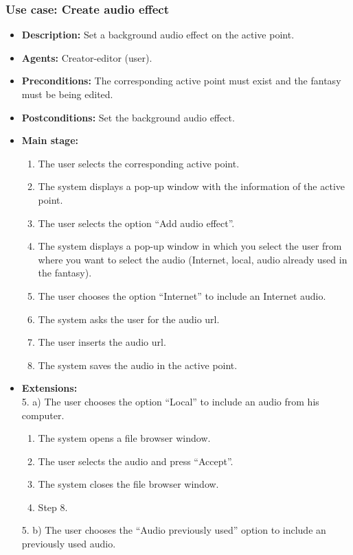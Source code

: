 \subsubsection{Use case: Create audio effect}
\begin{itemize}
	\item \textbf{Description:} Set a background audio effect on the active point.
	\item \textbf{Agents:} Creator-editor (user).
	\item \textbf{Preconditions:} The corresponding active point must exist and the fantasy must be being edited.
	\item \textbf{Postconditions:} Set the background audio effect.
	\item \textbf{Main stage:}
	\begin{enumerate}
		\item The user selects the corresponding active point.
		\item The system displays a pop-up window with the information of the active point.
		\item The user selects the option ``Add audio effect''.
		\item The system displays a pop-up window in which you select the user from where you want to select the audio (Internet, local, audio already used in the fantasy).
		\item The user chooses the option ``Internet'' to include an Internet audio.
		\item The system asks the user for the audio url.
		\item The user inserts the audio url.
		\item The system saves the audio in the active point.
	\end{enumerate}
	\item \textbf{Extensions:} \\ 5. a) The user chooses the option ``Local'' to include an audio from his computer.
	\begin{enumerate}
		\item The system opens a file browser window.
		\item The user selects the audio and press ``Accept''.
		\item The system closes the file browser window.
		\item Step 8.
	\end{enumerate}
	5. b) The user chooses the ``Audio previously used'' option to include an previously used audio.
	\begin{enumerate}

\end{enumerate}
\end{itemize}
